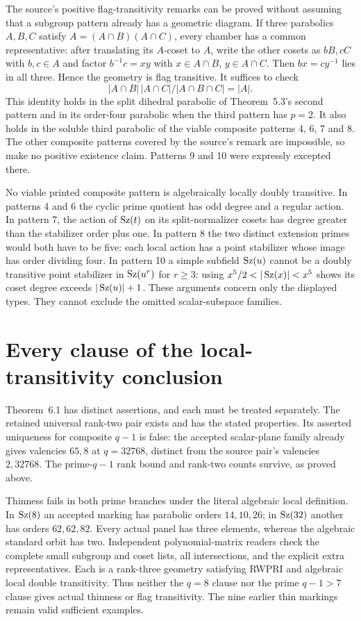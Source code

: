 \documentclass[11pt,a4paper]{article}
\begin{document}
The source's positive flag-transitivity remarks can be proved without
assuming that a subgroup pattern already has a geometric diagram.
If three parabolics $A,B,C$ satisfy
$A=(A\cap B)(A\cap C)$, every chamber has a common representative:
after translating its $A$-coset to $A$, write the other cosets as
$bB,cC$ with $b,c\in A$ and factor $b^{-1}c=xy$ with
$x\in A\cap B$, $y\in A\cap C$. Then $bx=cy^{-1}$ lies in all
three. Hence the geometry is flag transitive. It suffices to check
\[
 |A\cap B|\,|A\cap C|/|A\cap B\cap C|=|A|.
\]
This identity holds in the split dihedral parabolic of Theorem~5.3's
second pattern and in its order-four parabolic when the third pattern
has $p=2$. It also holds in the soluble third parabolic of the viable
composite patterns 4, 6, 7 and 8. The other composite patterns covered
by the source's remark are impossible, so make no positive existence
claim. Patterns 9 and 10 were expressly excepted there.

No viable printed composite pattern is algebraically locally doubly
transitive. In patterns 4 and 6 the cyclic prime quotient has odd
degree and a regular action. In pattern 7, the action of $\operatorname{Sz}(t)$
on its split-normalizer cosets has degree greater than the stabilizer
order plus one. In pattern 8 the two distinct extension primes would
both have to be five: each local action has a point stabilizer whose
image has order dividing four. In pattern 10 a simple subfield
$\operatorname{Sz}(u)$ cannot be a doubly transitive point stabilizer in
$\operatorname{Sz}(u^r)$ for $r\ge3$: using
$x^5/2<|\Sz(x)|<x^5$ shows its coset degree exceeds
$|\operatorname{Sz}(u)|+1$. These arguments concern only the displayed types.
They cannot exclude the omitted scalar-subspace families.

\section{Every clause of the local-transitivity conclusion}
Theorem~6.1 has distinct assertions, and each must be treated separately.
The retained universal rank-two pair exists and has the stated
properties. Its asserted uniqueness for composite $q-1$ is false:
the accepted scalar-plane family already gives valencies $65,8$ at
$q=32768$, distinct from the source pair's valencies $2,32768$.
The prime-$q-1$ rank bound and rank-two counts survive, as proved above.

Thinness fails in both prime branches under the literal algebraic
local definition. In $\operatorname{Sz}(8)$ an accepted marking has parabolic
orders $14,10,26$; in $\operatorname{Sz}(32)$ another has orders $62,62,82$.
Every actual panel has three elements, whereas the algebraic standard
orbit has two. Independent polynomial-matrix readers check the complete
small subgroup and coset lists, all intersections, and the explicit
extra representatives. Each is a rank-three geometry satisfying RWPRI
and algebraic local double transitivity. Thus neither the $q=8$ clause
nor the prime $q-1>7$ clause gives actual thinness or flag transitivity.
The nine earlier thin markings remain valid sufficient examples.
\end{document}
